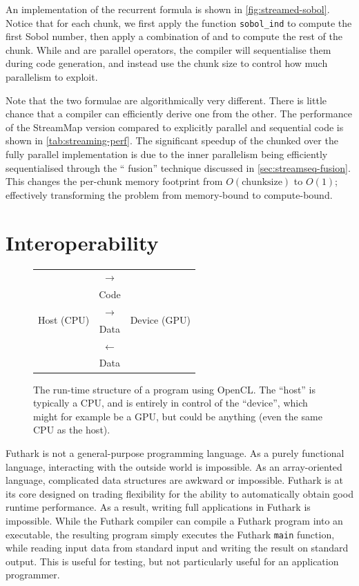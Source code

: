 An implementation of the recurrent formula is shown in
\cref{fig:streamed-sobol}.  Notice that for each chunk, we first apply
the function \texttt{sobol\_ind} to compute the first Sobol number,
then apply a combination of  and  to compute the rest
of the chunk.  While  and  are parallel operators,
the compiler will sequentialise them during code generation, and
instead use the chunk size to control how much parallelism to exploit.

Note that the two formulae are algorithmically very different.  There
is little chance that a compiler can efficiently derive one from the
other.  The performance of the StreamMap{} version compared to
explicitly parallel and sequential code is shown in
\cref{tab:streaming-perf}.  The significant speedup of the chunked
over the fully parallel implementation is due to the inner parallelism
being efficiently sequentialised through the ``\StreamSeq{} fusion''
technique discussed in \cref{sec:streamseq-fusion}.  This changes the
per-chunk memory footprint from $O(\textrm{chunksize})$ to $O(1)$;
effectively transforming the problem from memory-bound to
compute-bound.

\section{Interoperability}
\label{sec:interoperability}

\begin{figure}
\centering
\begin{tabular}{|c|c|c|}
  \cline{1-1}  \cline{3-3}
    \multirow{6}{*}{Host (CPU)} &$\longrightarrow$& \multirow{6}{*}{Device (GPU)} \\
    &Code& \\
    &$\longrightarrow$& \\
    &Data& \\
    &$\longleftarrow$& \\
    &Data& \\ \cline{1-1}  \cline{3-3}
  \end{tabular}

  \caption{The run-time structure of a program using OpenCL.  The
    ``host'' is typically a CPU, and is entirely in control of the
    ``device'', which might for example be a GPU, but could be
    anything (even the same CPU as the host).}
  \label{fig:opencl-structure}
\end{figure}

Futhark is not a general-purpose programming language.  As a purely
functional language, interacting with the outside world is impossible.
As an array-oriented language, complicated data structures are awkward
or impossible.  Futhark is at its core designed on trading flexibility
for the ability to automatically obtain good runtime performance.  As
a result, writing full applications in Futhark is impossible.  While
the Futhark compiler can compile a Futhark program into an executable,
the resulting program simply executes the Futhark \texttt{main}
function, while reading input data from standard input and writing the
result on standard output.  This is useful for testing, but not
particularly useful for an application programmer.

